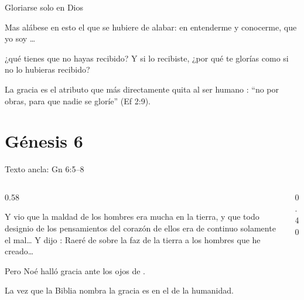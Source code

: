 \begin{frame}{Gloriarse solo en Dios}
\begin{cita}Mas alábese en esto el que se hubiere de alabar: en entenderme y conocerme, que yo soy \SENOR{}\ldots{}\end{cita}
\begin{cita}¿qué tienes que no hayas recibido? Y si lo recibiste, ¿por qué te glorías como si no lo hubieras recibido?\end{cita}
\small La gracia es el atributo que más directamente quita al ser humano : ``no por obras, para que nadie se gloríe'' (Ef 2:9).\par\medskip
\centering
{}
\end{frame}

\section{Génesis 6}

\begin{frame}{Texto ancla: Gn 6:5--8}
\begin{columns}[c,onlytextwidth]
\begin{column}{0.58\textwidth}
\begin{cita}Y vio \SENOR{} que la maldad de los hombres era mucha en la tierra, y que todo designio de los pensamientos del corazón de ellos era de continuo solamente el mal\ldots{} Y dijo \SENOR: Raeré de sobre la faz de la tierra a los hombres que he creado\ldots{}\end{cita}
\begin{cita}Pero Noé halló gracia ante los ojos de \SENOR{}.\end{cita}
\small La  vez que la Biblia nombra la gracia es en el  de la humanidad.
\end{column}
\begin{column}{0.40\textwidth}\end{column}
\end{columns}
\end{frame}

